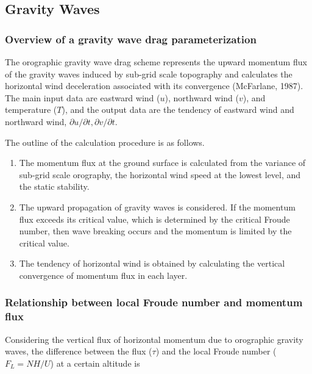 \hypertarget{gravity-waves}{%
\subsection{Gravity Waves}\label{gravity-waves}}

\hypertarget{overview-of-a-gravity-wave-drag-parameterization}{%
\subsubsection{Overview of a gravity wave drag
parameterization}\label{overview-of-a-gravity-wave-drag-parameterization}}

The orographic gravity wave drag scheme represents the upward momentum
flux of the gravity waves induced by sub-grid scale topography and
calculates the horizontal wind deceleration associated with its
convergence (McFarlane, 1987). The main input data are eastward wind
(\(u\)), northward wind (\(v\)), and temperature (\(T\)), and the output
data are the tendency of eastward wind and northward wind,
\(\partial u/\partial t, \partial v/\partial t\).

The outline of the calculation procedure is as follows.

\begin{enumerate}
\def\labelenumi{\arabic{enumi}.}
\item
  The momentum flux at the ground surface is calculated from the
  variance of sub-grid scale orography, the horizontal wind speed at the
  lowest level, and the static stability.
\item
  The upward propagation of gravity waves is considered. If the momentum
  flux exceeds its critical value, which is determined by the critical
  Froude number, then wave breaking occurs and the momentum is limited
  by the critical value.
\item
  The tendency of horizontal wind is obtained by calculating the
  vertical convergence of momentum flux in each layer.
\end{enumerate}

\hypertarget{relationship-between-local-froude-number-and-momentum-flux}{%
\subsubsection{Relationship between local Froude number and momentum
flux}\label{relationship-between-local-froude-number-and-momentum-flux}}

Considering the vertical flux of horizontal momentum due to orographic
gravity waves, the difference between the flux (\(\tau\)) and the local
Froude number (\(F_L = NH/U\)) at a certain altitude is

